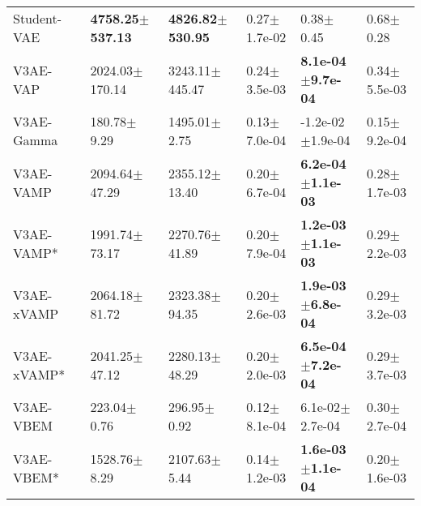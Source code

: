 \begin{tabular}{llllll}
Student-VAE            &  \textbf{4758.25$\pm$537.13} &  \textbf{4826.82$\pm$530.95} &           0.27$\pm$1.7e-02 &                 0.38$\pm$0.45 &              0.68$\pm$0.28 \\
V3AE-VAP               &           2024.03$\pm$170.14 &           3243.11$\pm$445.47 &           0.24$\pm$3.5e-03 &  \textbf{8.1e-04$\pm$9.7e-04} &           0.34$\pm$5.5e-03 \\
V3AE-Gamma             &              180.78$\pm$9.29 &             1495.01$\pm$2.75 &           0.13$\pm$7.0e-04 &          -1.2e-02$\pm$1.9e-04 &           0.15$\pm$9.2e-04 \\
V3AE-VAMP              &            2094.64$\pm$47.29 &            2355.12$\pm$13.40 &           0.20$\pm$6.7e-04 &  \textbf{6.2e-04$\pm$1.1e-03} &           0.28$\pm$1.7e-03 \\
V3AE-VAMP*             &            1991.74$\pm$73.17 &            2270.76$\pm$41.89 &           0.20$\pm$7.9e-04 &  \textbf{1.2e-03$\pm$1.1e-03} &           0.29$\pm$2.2e-03 \\
V3AE-xVAMP             &            2064.18$\pm$81.72 &            2323.38$\pm$94.35 &           0.20$\pm$2.6e-03 &  \textbf{1.9e-03$\pm$6.8e-04} &           0.29$\pm$3.2e-03 \\
V3AE-xVAMP*            &            2041.25$\pm$47.12 &            2280.13$\pm$48.29 &           0.20$\pm$2.0e-03 &  \textbf{6.5e-04$\pm$7.2e-04} &           0.29$\pm$3.7e-03 \\
V3AE-VBEM              &              223.04$\pm$0.76 &              296.95$\pm$0.92 &           0.12$\pm$8.1e-04 &           6.1e-02$\pm$2.7e-04 &           0.30$\pm$2.7e-04 \\
V3AE-VBEM*             &             1528.76$\pm$8.29 &             2107.63$\pm$5.44 &           0.14$\pm$1.2e-03 &  \textbf{1.6e-03$\pm$1.1e-04} &           0.20$\pm$1.6e-03 \\
\bottomrule
\end{tabular}

